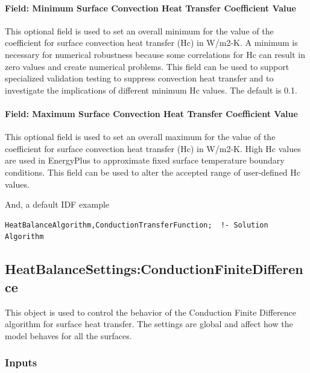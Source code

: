 \paragraph{Field: Minimum Surface Convection Heat Transfer Coefficient Value}\label{field-minimum-surface-convection-heat-transfer-coefficient-value}

This optional field is used to set an overall minimum for the value of the coefficient for surface convection heat transfer (Hc) in W/m2-K. A minimum is necessary for numerical robustness because some correlations for Hc can result in zero values and create numerical problems. This field can be used to support specialized validation testing to suppress convection heat transfer and to investigate the implications of different minimum Hc values. The default is 0.1.

\paragraph{Field: Maximum Surface Convection Heat Transfer Coefficient Value}\label{field-maximum-surface-convection-heat-transfer-coefficient-value}

This optional field is used to set an overall maximum for the value of the coefficient for surface convection heat transfer (Hc) in W/m2-K. High Hc values are used in EnergyPlus to approximate fixed surface temperature boundary conditions. This field can be used to alter the accepted range of user-defined Hc values.

And, a default IDF example

\begin{lstlisting}
HeatBalanceAlgorithm,ConductionTransferFunction;  !- Solution Algorithm
\end{lstlisting}

\subsection{HeatBalanceSettings:ConductionFiniteDifference}\label{heatbalancesettingsconductionfinitedifference}

This object is used to control the behavior of the Conduction Finite Difference algorithm for surface heat transfer. The settings are global and affect how the model behaves for all the surfaces.

\subsubsection{Inputs}\label{inputs-7-025}

